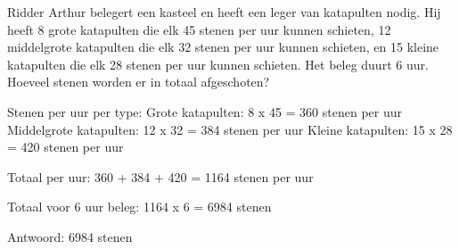 \begin{opgave}
Ridder Arthur belegert een kasteel en heeft een leger van katapulten nodig. 
Hij heeft 8 grote katapulten die elk 45 stenen per uur kunnen schieten, 12 
middelgrote katapulten die elk 32 stenen per uur kunnen schieten, en 15 kleine 
katapulten die elk 28 stenen per uur kunnen schieten. Het beleg duurt 6 uur. 
Hoeveel stenen worden er in totaal afgeschoten?
\end{opgave}

\begin{oplossing}
Stenen per uur per type:
Grote katapulten: 8 x 45 = 360 stenen per uur
Middelgrote katapulten: 12 x 32 = 384 stenen per uur
Kleine katapulten: 15 x 28 = 420 stenen per uur

Totaal per uur:
360 + 384 + 420 = 1164 stenen per uur

Totaal voor 6 uur beleg:
1164 x 6 = 6984 stenen

Antwoord: 6984 stenen
\end{oplossing}